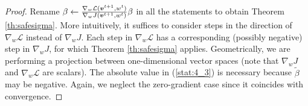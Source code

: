 \allsafe*
\begin{proof}
Rename $\beta \gets \frac{\gradDelta(\vv^{t+1},w^t)}{\gradJ[w]{\vv^{t+1},w^t}}\beta$ in all the statements to obtain Theorem \ref{th:safesigma}. More intuitively, it suffices to consider steps in the direction of $\nabla_w\mathcal{L}$ instead of $\nabla_w J$. Each step in $\nabla_w\mathcal{L}$ has a corresponding (possibly negative) step in $\nabla_w J$, for which Theorem \ref{th:safesigma} applies. Geometrically, we are performing a projection between one-dimensional vector spaces (note that $\nabla_w J$ and $\nabla_w\mathcal{L}$ are scalars). The absolute value in (\ref{stat:4_3}) is necessary because $\tilde{\beta}$ may be negative. Again, we neglect the zero-gradient case since it coincides with convergence.  
\end{proof}
